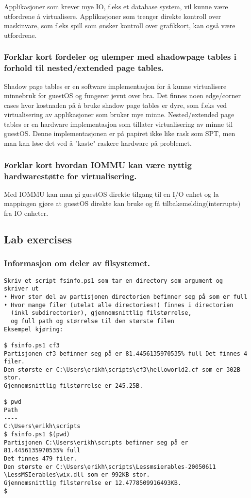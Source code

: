 \documentclass[9pt]{article}
\begin{document}
Applikasjoner som krever mye IO, f.eks et database system, vil kunne være utfordrene å virtualisere. Applikasjoner som trenger direkte kontroll over maskinvare, som f.eks spill som ønsker kontroll over grafikkort, kan også være utfordrene. 

\subsubsection{Forklar kort fordeler og ulemper med shadowpage tables i forhold til nested/extended page tables.}

Shadow page tables er en software implementasjon for å kunne virtualisere minnebruk for guestOS og fungerer jevnt over bra. Det finnes noen edge/corner cases hvor kostnaden på å bruke shadow page tables er dyre, som f.eks ved virtualisering av applikasjoner som bruker mye minne. Nested/extended page tables er en hardware implementasjon som tillater virtualisering av minne til guestOS. Denne implementasjonen er på papiret ikke like rask som SPT, men man kan løse det ved å "kaste" raskere hardware på problemet. 

\subsubsection{Forklar kort hvordan IOMMU kan være nyttig hardwarestøtte for virtualisering.}

Med IOMMU kan man gi guestOS direkte tilgang til en I/O enhet og la mappingen gjøre at guestOS direkte kan bruke og få tilbakemelding(interrupts) fra IO enheter.


\subsection{Lab exercises}



\subsubsection{Informasjon om deler av filsystemet.}
\begin{verbatim}
Skriv et script fsinfo.ps1 som tar en directory som argument og skriver ut
• Hvor stor del av partisjonen directorien befinner seg på som er full
• Hvor mange filer (utelat alle directories!) finnes i directorien 
  (inkl subdirectorier), gjennomsnittlig filstørrelse, 
  og full path og størrelse til den største filen 
Eksempel kjøring:

$ fsinfo.ps1 cf3
Partisjonen cf3 befinner seg på er 81.4456135970535% full Det finnes 4 filer.
Den største er C:\Users\erikh\scripts\cf3\helloworld2.cf som er 302B stor.
Gjennomsnittlig filstørrelse er 245.25B.

$ pwd
Path
----
C:\Users\erikh\scripts
$ fsinfo.ps1 $(pwd)
Partisjonen C:\Users\erikh\scripts befinner seg på er 81.4456135970535% full
Det finnes 479 filer.
Den største er C:\Users\erikh\scripts\Lessmsierables-20050611 \LessMSIerables\wix.dll som er 992KB stor.
Gjennomsnittlig filstørrelse er 12.4778509916493KB.
$
\end{verbatim}
\end{document}

